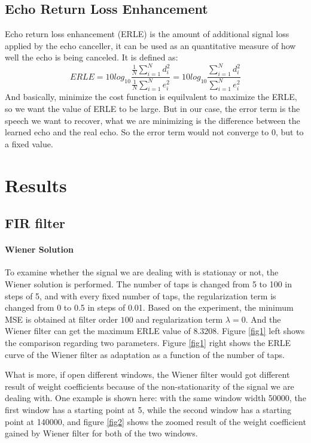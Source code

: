 \documentclass[conference]{IEEEtran}
\begin{document}
	\subsection{Echo Return Loss Enhancement} Echo return loss enhancement (ERLE) is the amount of additional signal loss applied by the echo canceller, it can be used as an quantitative measure of how well the echo is being canceled. It is defined as:
	\begin{equation}ERLE = 10log_{10}\displaystyle\frac{\frac{1}{N}\sum_{i=1}^{N}d_i^2}{\frac{1}{N}\sum_{i=1}^{N}e_i^2} = 10log_{10}\displaystyle\frac{\sum_{i=1}^{N}d_i^2}{\sum_{i=1}^{N}e_i^2}\label{6}\end{equation}
And basically, minimize the cost function is equilvalent to maximize the ERLE, so we want the value of ERLE to be large. But in our case, the error term is the speech we want to recover, what we are minimizing is the difference between the learned echo and the real echo. So the error term would not converge to 0, but to a fixed value.
	
	
\section{Results}
	\subsection{FIR filter}
		\paragraph{Wiener Solution} To examine whether the signal we are dealing with is stationay or not, the Wiener solution is performed. The number of taps is changed from 5 to 100 in steps of 5, and with every fixed number of taps, the regularization term is changed from 0 to 0.5 in steps of 0.01. Based on the experiment, the minimum MSE is obtained at filter order $100$ and regularization term $\lambda= 0$. And the Wiener filter can get the maximum ERLE value of 8.3208. Figure \ref{fig1} left shows the comparison regarding two parameters. Figure \ref{fig1} right shows the ERLE curve of the Wiener filter as adaptation as a function of the number of taps. 
		
What is more, if open different windows, the Wiener filter would got different result of weight coefficients because of the non-stationarity of the signal we are dealing with. One example is shown here: with the same window width 50000, the first window has a starting point at 5, while the second window has a starting point at 140000, and figure \ref{fig2} shows the zoomed result of the weight coefficient gained by Wiener filter for both of the two windows.
\end{document}
